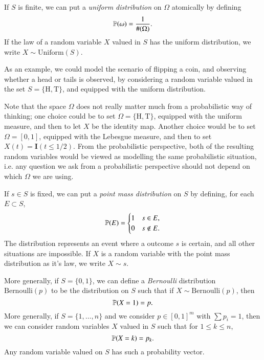 \begin{example}
    If $S$ is finite, we can put a \emph{uniform distribution} on $\Omega$ atomically by defining
    \[ \operatorname{\mathbb{P}}(\omega) = \frac{1}{\#(\Omega)}. \]
    If the law of a random variable $X$ valued in $S$ has the uniform distribution, we write $X \sim \text{Uniform}(S)$.

    As an example, we could model the scenario of flipping a coin, and observing whether a head or tails is observed, by considering a random variable valued in the set $S = \{ \text{H}, \text{T} \}$, and equipped with the uniform distribution.

    Note that the space $\Omega$ does not really matter much from a probabilistic way of thinking; one choice could be to set $\Omega = \{ \text{H}, \text{T} \}$, equipped with the uniform measure, and then to let $X$ be the identity map. Another choice would be to set $\Omega = [0,1]$, equipped with the Lebesgue measure, and then to set $X(t) = \mathbf{I}(t \leq 1/2)$. From the probabilistic perspective, both of the resulting random variables would be viewed as modelling the same probabilistic situation, i.e. any question we ask from a probabilistic perspective should not depend on which $\Omega$ we are using.
\end{example}

\begin{example}
    If $s \in S$ is fixed, we can put a \emph{point mass distribution} on $S$ by defining, for each $E \subset S$,
    \[ \mathbb{P}(E) = \begin{cases} 1 & s \in E, \\ 0 & s \not \in E. \end{cases} \]
    The distribution represents an event where a outcome $s$ is certain, and all other situations are impossible. If $X$ is a random variable with the point mass distribution as it's law, we write $X \sim s$.
\end{example}

More generally, if $S = \{ 0, 1 \}$, we can define a \emph{Bernoulli} distribution $\text{Bernoulli}(p)$ to be the distribution on $S$ such that if $X \sim \text{Bernoulli}(p)$, then
%
\[ \operatorname{\mathbb{P}}(X = 1) = p. \]
%
More generally, if $S = \{ 1, \dots, n \}$ and we consider $p \in [0,1]^m$ with $\sum p_i = 1$, then we can consider random variables $X$ valued in $S$ such that for $1 \leq k \leq n$,
%
\[ \operatorname{\mathbb{P}}(X = k) = p_k. \]
%
Any random variable valued on $S$ has such a probability vector.

